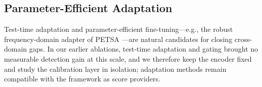 \subsection{Parameter-Efficient Adaptation}
Test-time adaptation and parameter-efficient fine-tuning---e.g., the robust frequency-domain adapter of PETSA \cite{petsa2025}---are natural candidates for closing cross-domain gaps. In our earlier ablations, test-time adaptation and gating brought no measurable detection gain at this scale, and we therefore keep the encoder fixed and study the calibration layer in isolation; adaptation methods remain compatible with the framework as score providers.
